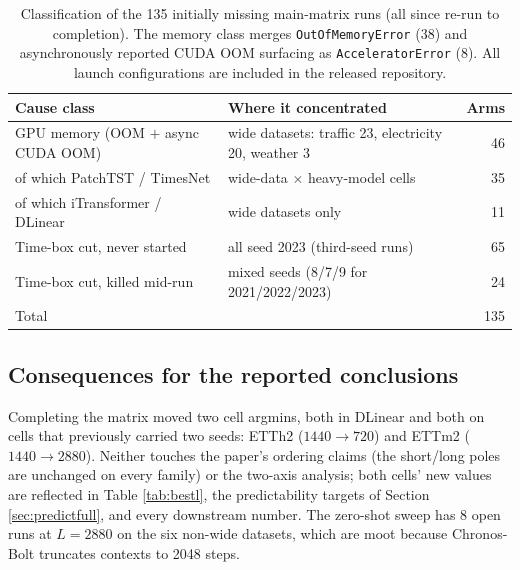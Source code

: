 \begin{table}[t]
\caption{Classification of the 135 initially missing main-matrix runs (all since re-run to completion). The memory class merges \texttt{OutOfMemoryError} (38) and asynchronously reported CUDA OOM surfacing as \texttt{AcceleratorError} (8). All launch configurations are included in the released repository.}
\label{tab:ledger}
\centering\small
\begin{tabular}{llr}
\toprule
Cause class & Where it concentrated & Arms \\
\midrule
GPU memory (OOM $+$ async CUDA OOM) & wide datasets: traffic 23, electricity 20, weather 3 & 46 \\
\quad of which PatchTST / TimesNet & wide-data $\times$ heavy-model cells & 35 \\
\quad of which iTransformer / DLinear & wide datasets only & 11 \\
Time-box cut, never started & all seed 2023 (third-seed runs) & 65 \\
Time-box cut, killed mid-run & mixed seeds (8/7/9 for 2021/2022/2023) & 24 \\
\midrule
Total & & 135 \\
\bottomrule
\end{tabular}
\end{table}

\subsection{Consequences for the reported conclusions}

Completing the matrix moved two cell argmins, both in DLinear and both on cells that previously carried two seeds: ETTh2 ($1440 \to 720$) and ETTm2 ($1440 \to 2880$). Neither touches the paper's ordering claims (the short/long poles are unchanged on every family) or the two-axis analysis; both cells' new values are reflected in Table \ref{tab:bestl}, the predictability targets of Section \ref{sec:predictfull}, and every downstream number. The zero-shot sweep has 8 open runs at $L{=}2880$ on the six non-wide datasets, which are moot because Chronos-Bolt truncates contexts to 2048 steps.
